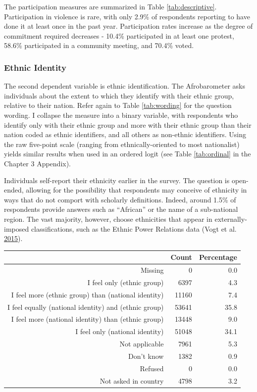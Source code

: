 \documentclass[12pt,]{book}
\let\origtable\table
\let\endorigtable\endtable
\renewenvironment{table}[1][2] {
    \singlespacing
    \expandafter\origtable\expandafter[H]
} {
    \endorigtable
}
\theoremstyle{definition}
\theoremstyle{definition}
\theoremstyle{definition}
\theoremstyle{remark}
\begin{document}
The participation measures are summarized in Table
\ref{tab:descriptive}. Participation in violence is rare, with only
2.9\% of respondents reporting to have done it at least once in the past
year. Participation rates increase as the degree of commitment required
decreases - 10.4\% participated in at least one protest, 58.6\%
participated in a community meeting, and 70.4\% voted.

\hypertarget{ethnic-identity-1}{%
\subsubsection*{Ethnic Identity}\label{ethnic-identity-1}}

The second dependent variable is ethnic identification. The
Afrobarometer asks individuals about the extent to which they identify
with their ethnic group, relative to their nation. Refer again to Table
\ref{tab:wording} for the question wording. I collapse the measure into
a binary variable, with respondents who identify only with their ethnic
group and more with their ethnic group than their nation coded as ethnic
identifiers, and all others as non-ethnic identifiers. Using the raw
five-point scale (ranging from ethnically-oriented to most nationalist)
yields similar results when used in an ordered logit (see Table
\ref{tab:ordinal} in the Chapter 3 Appendix).

Individuals self-report their ethnicity earlier in the survey. The
question is open-ended, allowing for the possibility that respondents
may conceive of ethnicity in ways that do not comport with scholarly
definitions. Indeed, around 1.5\% of respondents provide answers such as
``African'' or the name of a sub-national region. The vast majority,
however, choose ethnicities that appear in externally-imposed
classifications, such as the Ethnic Power Relations data (Vogt et al.
\protect\hyperlink{ref-Vogt2015}{2015}).

\begin{table}[ht]
\centering
\begin{tabular}{rrr}
  \hline
 & Count & Percentage \\ 
  \hline
Missing & 0 & 0.0 \\ 
  I feel only (ethnic group) & 6397 & 4.3 \\ 
  I feel more (ethnic group) than (national identity) & 11160 & 7.4 \\ 
  I feel equally (national identity) and (ethnic group) & 53641 & 35.8 \\ 
  I feel more (national identity) than (ethnic group) & 13448 & 9.0 \\ 
  I feel only (national identity) & 51048 & 34.1 \\ 
  Not applicable & 7961 & 5.3 \\ 
  Don't know & 1382 & 0.9 \\ 
  Refused & 0 & 0.0 \\ 
  Not asked in country & 4798 & 3.2 \\ 
   \hline
\end{tabular}
\caption{Summary of Ethnic Identification (waves 3-6)} 
\label{tab:ethnicdescrip}
\end{table}
\end{document}
